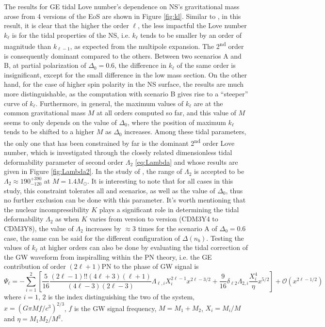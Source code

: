 The results for \gls{GE} tidal Love number's dependence on \gls{NS}'s gravitational mass arose from 4 versions of the \gls{EoS} are shown in Figure \ref{fig:kl}. Similar to \cite{perot2021role}, in this result, it is clear that the higher the order $\ell$, the less impactful the Love number $k_\ell$ is for the tidal properties of the \gls{NS}, i.e. $k_\ell$ tends to be smaller by an order of magnitude than $k_{\ell-1}$, as expected from the multipole expansion. The 2\textsuperscript{nd} order is consequently dominant compared to the others. Between two scenarios A and B, at partial polarization of $\Delta_0 = 0.6$, the difference in $k_\ell$ of the same order is insignificant, except for the small difference in the low mass section. On the other hand, for the case of higher spin polarity in the \gls{NS} surface, the results are much more distinguishable, as the computation with scenario B gives rise to a ``steeper'' curve of $k_\ell$. Furthermore, in general, the maximum values of $k_\ell$ are at the common gravitational mass $M$ at all orders computed so far, and this value of $M$ seems to only depends on the value of $\Delta_0$, where the position of maximum $k_\ell$ tends to be shifted to a higher $M$ as $\Delta_0$ increases. Among these tidal parameters, the only one that has been constrained by far is the dominant 2\textsuperscript{nd} order Love number, which is investigated through the closely related dimensionless tidal deformability parameter of second order $\Lambda_2$ \eqref{eq:Lambda} and whose results are given in Figure \ref{fig:Lambda2}. In the study of \cite{abbott2018gw170817}, the range of $\Lambda_2$ is accepted to be $\Lambda_2 \approx 190^{+390}_{-120}$ at $M=1.4M_\odot$. It is interesting to note that for all cases in this study, this constraint tolerates all  and scenarios, as well as the value of $\Delta_0$, thus no further exclusion can be done with this parameter. It's worth mentioning that the nuclear incompressibility $K$ plays a significant role in determining the tidal deformability $\Lambda_2$ as when $K$ varies from version to version (CDM3Y4 to CDM3Y8), the value of $\Lambda_2$ increases by $\approx 3$ times for the scenario A of $\Delta_0 = 0.6$ case, the same can be said for the different configuration of $\Delta(n_b)$. Testing the values of $k_\ell$ at higher orders can also be done by evaluating the tidal correction of the \gls{GW} waveform from inspiralling  within the PN theory, i.e. the \gls{GE} contribution of order $(2\ell+1)$PN to the phase of \gls{GW} signal is \citep{perot2021role, yagi2014multipole}
\begin{equation}
    \Psi_\ell = - \sum^{2}_{i=1} \left[ \frac{5}{16} \frac{(2\ell-1)!! (4\ell+3)(\ell+1)}{(4\ell-3)(2\ell-3)} \Lambda_{\ell,i} X_i^{2\ell-1} x^{2\ell - 3/2} + \frac{9}{16} \delta_{\ell 2} \Lambda_{2, i} \frac{X_i^4}{\eta} x^{5/2} \right] + \mathcal{O}(x^{2\ell-1/2})
\end{equation}
where $i=1,\,2$ is the index distinguishing the two  of the system, $x=\left( G\pi Mf/c^3 \right)^{2/3}$, $f$ is the \gls{GW} signal frequency, $M=M_1 + M_2$, $X_i = M_i/M$ and $\eta = M_1 M_2/M^2$.

